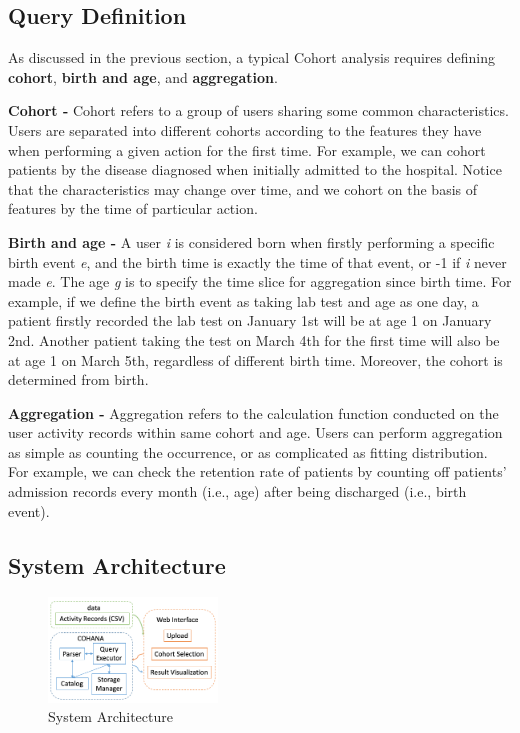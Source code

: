 \documentclass[10pt,conference,letterpaper]{IEEEtran}
\begin{document}
\subsection{Query Definition}
As discussed in the previous section, a typical Cohort analysis requires defining \textbf{cohort}, \textbf{birth and age}, and \textbf{aggregation}. 

\textbf{Cohort -} Cohort refers to a group of users sharing some common characteristics. Users are separated into different cohorts according to the features they have when performing a given action for the first time. For example, we can cohort patients by the disease diagnosed when initially admitted to the hospital. Notice that the characteristics may change over time, and we cohort on the basis of features by the time of particular action.

\textbf{Birth and age -} A user \emph{i} is considered born when firstly performing a specific birth event \emph{e}, and the birth time is exactly the time of that event, or -1 if \emph{i} never made \emph{e}. The age \emph{g} is to specify the time slice for aggregation since birth time. For example, if we define the birth event as taking lab test and age as one day, a patient firstly recorded the lab test on January 1st will be at age 1 on January 2nd. Another patient taking the test on March 4th for the first time will also be at age 1 on March 5th, regardless of different birth time. Moreover, the cohort is determined from birth.

\textbf{Aggregation -} Aggregation refers to the calculation function conducted on the user activity records within same cohort and age. Users can perform aggregation as simple as counting the occurrence, or as complicated as fitting distribution. For example, we can check the retention rate of patients by counting off patients' admission records every month (i.e., age) after being discharged (i.e., birth event).

\subsection{System Architecture}

\begin{figure}
    \centering
    \includegraphics[width=0.4\textwidth]{arch.png}
    \caption{System Architecture}
    \label{fig:sys_arch}
\end{figure}
\end{document}
